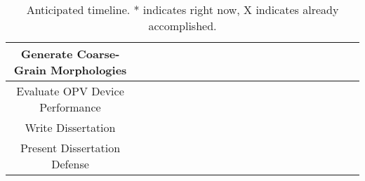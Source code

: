 \begin{table}[h]
{\begin{tabular}{| c | c | c | c | c | c | c | c | c | c | c | c | c | c | c | c | c | c | c | c | c |}
        \hline
           Generate Coarse-Grain Morphologies           & & & & & & & & & & & & & & \multicolumn{4}{|c|}{{\cellcolor{lgray}}}& & &\\
        \hline
           Evaluate OPV Device Performance & & & & & & & & & & & & & & \multicolumn{4}{|c|}{{\cellcolor{lgray}}} & & &\\
        \hline
           Write Dissertation & & & & & & & & & & & & & & & &{\cellcolor{lgray}}& {\cellcolor{lgray}}& {\cellcolor{lgray}} &  &\\
        \hline
           Present Dissertation Defense  &  &  &  &  &  &  &  &  &  &  &  &  &  &  &  &&  & {\cellcolor{lgray}} &  &\\
        \hline
    \end{tabular}}
    \caption{Anticipated timeline. * indicates right now, X indicates already accomplished.}
\end{table}
